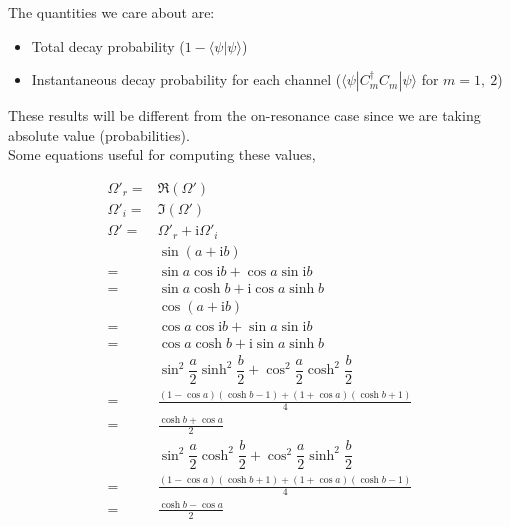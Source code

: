 \documentclass[10pt,fleqn]{article}
\newcommand{\ui}{\mathrm{i}}
\newcommand{\eqar}[1]
{
  \begin{align*}
    #1
  \end{align*}
}
\newcommand{\paren}[1]{{\left({#1}\right)}}
\begin{document}
The quantities we care about are:
\begin{itemize}
\item Total decay probability ($1-\langle\psi|\psi\rangle$)
\item Instantaneous decay probability for each channel ($\langle\psi|C_m^\dagger C_m|\psi\rangle$ for $m=1,\ 2$)
\end{itemize}
These results will be different from the on-resonance case since we are taking absolute value
(probabilities).\\

Some equations useful for computing these values,
\eqar{
  \Omega'_r=&\Re\paren{\Omega'}\\
  \Omega'_i=&\Im\paren{\Omega'}\\
  \Omega'=&\Omega'_r+\ui\Omega'_i\\
  &\sin\paren{a+\ui b}\\
  =&\sin a\cos\ui b+\cos a\sin\ui b\\
  =&\sin a\cosh b+\ui\cos a\sinh b\\
  &\cos\paren{a+\ui b}\\
  =&\cos a\cos\ui b+\sin a\sin\ui b\\
  =&\cos a\cosh b+\ui\sin a\sinh b\\
  &\sin^2\dfrac{a}{2}\sinh^2\dfrac{b}{2}+\cos^2\dfrac{a}{2}\cosh^2\dfrac{b}{2}\\
  =&\frac{(1 - \cos a)(\cosh b - 1)+(1 + \cos a)(\cosh b + 1)}{4}\\
  =&\frac{\cosh b + \cos a}{2}\\
  &\sin^2\dfrac{a}{2}\cosh^2\dfrac{b}{2}+\cos^2\dfrac{a}{2}\sinh^2\dfrac{b}{2}\\
  =&\frac{(1 - \cos a)(\cosh b + 1)+(1 + \cos a)(\cosh b - 1)}{4}\\
  =&\frac{\cosh b - \cos a}{2}
}
\end{document}
